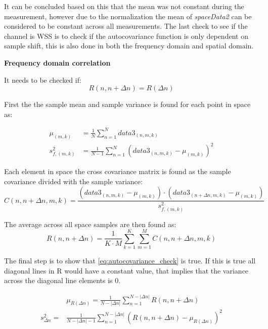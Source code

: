 It can be concluded based on this that the mean was not constant during the measurement, however due to the normalization the mean of \textit{spaceData2} can be considered to be constant across all measurements. The last check to see if the channel is \gls{WSS} is to check if the autocovariance function is only dependent on sample shift, this is also done in both the frequency domain and spatial domain.

\textbf{Frequency domain correlation}

It needs to be checked if:
\begin{equation}\label{eq:autocovariance_check}
R(n,n+\Delta n) = R(\Delta n) 
\end{equation}

First the the sample mean and sample variance is found for each point in space as:

\begin{align}
\mu_{(m,k)} &= \frac{1}{N}\sum_{n = 1}^{N} data3_{(n,m,k)} \\
s_{f,(m,k)}^2 &= \frac{1}{N-1}\sum_{n = 1}^{N} \left( data3_{(n,m,k)} - \mu_{(m,k)} \right)^2 
\end{align}

Each element in space the cross covariance matrix is found as the sample covariance divided with the sample variance:
\begin{equation}
C(n,n+\Delta n,m,k) = \frac{\left(data3_{(n,m,k)}-\mu_{(m,k)}\right)\cdot \left(data3_{(n+\Delta n,m,k)}-\mu_{(m,k)}\right)}{s_{f,(m,k)}^2}
\end{equation}

The average across all space samples are then found as:
\begin{equation}
R(n,n+\Delta n) = \frac{1}{K\cdot M}\sum_{k = 1}^{K}\sum_{m = 1}^{M} C(n,n+\Delta n,m,k)
\end{equation}


The final step is to show that \autoref{eq:autocovariance_check} is true. If this is true all diagonal lines in R would have a constant value, that implies that the variance across the diagonal line elements is 0. 

\begin{align}
&\mu_{R(\Delta n)} = \frac{1}{N-|\Delta n|}\sum_{n = 1}^{N-|\Delta n|} R(n,n+\Delta n) \\
s_{\Delta n}^2 = &\frac{1}{N-|\Delta n|-1}\sum_{n = 1}^{N-|\Delta n|} \left( R(n,n+\Delta n) - \mu_{R(\Delta n)} \right)^2 \label{eq:variance_of_covariance}
\end{align}

